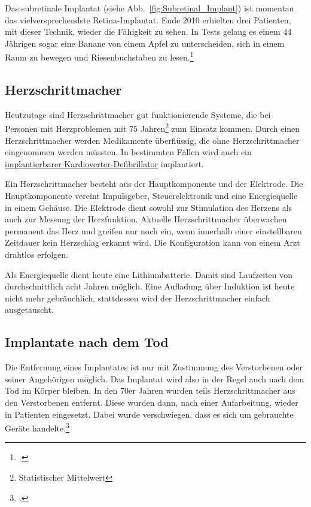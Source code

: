 Das subretinale Implantat (siehe Abb.~\vref{fig:Subretinal_Implant}) ist momentan das
vielversprechendste Retina-Implantat. Ende 2010 erhielten
drei Patienten, mit dieser Technik, wieder die Fähigkeit zu sehen. In Tests gelang es einem 44
Jährigen sogar eine Banane von einem Apfel zu unterscheiden, sich in einem Raum zu bewegen und
Riesenbuchstaben zu lesen.\footcite{Independent:retina_chip}

\clearpage
\subsection{Herzschrittmacher}
\label{sec:Robin:topical:Pacemaker}
Heutzutage sind Herzschrittmacher gut funktionierende Systeme, die bei Personen mit Herzproblemen mit
75 Jahren\footnote{Statistischer Mittelwert} zum Einsatz kommen. Durch einen Herzschrittmacher werden
Medikamente überflüssig, die ohne Herzschrittmacher eingenommen werden müssten.
In bestimmten Fällen wird auch ein
\href{http://de.wikipedia.org/wiki/Implantierbarer_Kardioverter-Defibrillator}%
{implantierbarer Kardioverter-Defibrillator} implantiert.

Ein Herzschrittmacher besteht aus der Hauptkomponente und der Elektrode. Die Hauptkomponente vereint
Impulsgeber, Steuerelektronik und eine Energiequelle in einem Gehäuse. Die Elektrode dient sowohl zur
Stimulation des Herzens als auch zur Messung der Herzfunktion. Aktuelle Herzschrittmacher überwachen
permanent das Herz und greifen nur noch ein, wenn innerhalb einer einstellbaren Zeitdauer kein
Herzschlag erkannt wird. Die Konfiguration kann von einem Arzt drahtlos erfolgen.

Als Energiequelle dient heute eine Lithiumbatterie. Damit sind Laufzeiten von durchschnittlich acht
Jahren möglich. Eine Aufladung über Induktion ist heute nicht mehr gebräuchlich, stattdessen wird der
Herzschrittmacher einfach ausgetauscht.

\subsection{Implantate nach dem Tod}
Die Entfernung eines Implantates ist nur mit Zustimmung des Verstorbenen oder seiner Angehörigen
möglich. Das Implantat wird also in der Regel auch nach dem Tod im Körper bleiben. In den 70er Jahren
wurden teils Herzschrittmacher aus den Verstorbenen entfernt. Diese wurden dann, nach einer
Aufarbeitung, wieder in Patienten eingesetzt. Dabei wurde verschwiegen, dass es sich um gebrauchte
Geräte handelte.\footcite{Spiegel:Herzschrittmacher-Prozess}
